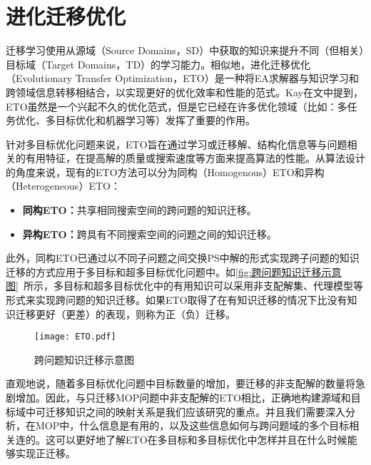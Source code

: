 \section{进化迁移优化}
\label{sec:背景介绍:进化迁移优化}
迁移学习使用从源域（Source Domains，SD）中获取的知识来提升不同（但相关）目标域（Target Domains，TD）的学习能力\cite{pan2009survey}。相似地，进化迁移优化（Evolutionary Transfer Optimization，ETO）是一种将EA求解器与知识学习和跨领域信息转移相结合，以实现更好的优化效率和性能的范式。Kay在文中提到\cite{tan2021evolutionary}，ETO虽然是一个兴起不久的优化范式，但是它已经在许多优化领域（比如：多任务优化、多目标优化和机器学习等）发挥了重要的作用。
\par
针对多目标优化问题来说，ETO旨在通过学习或迁移解、结构化信息等与问题相关的有用特征，在提高解的质量或搜索速度等方面来提高算法的性能。从算法设计的角度来说，现有的ETO方法可以分为同构（Homogenous）ETO和异构（Heterogeneous）ETO：
\begin{itemize}
    \item \textbf{同构ETO：}共享相同搜索空间的跨问题的知识迁移。
    \item \textbf{异构ETO：}跨具有不同搜索空间的问题之间的知识迁移。
\end{itemize}
此外，同构ETO已通过以不同子问题之间交换PS中解的形式实现跨子问题的知识迁移的方式应用于多目标和超多目标优化问题中\cite{tan2021evolutionary}。如\autoref{fig:跨问题知识迁移示意图}~所示，多目标和超多目标优化中的有用知识可以采用非支配解集、代理模型等形式来实现跨问题的知识迁移。如果ETO取得了在有知识迁移的情况下比没有知识迁移更好（更差）的表现，则称为正（负）迁移。
\begin{figure}[htb]
    \texttt{[image: ETO.pdf]}
    \caption[跨问题知识迁移示意图]{跨问题知识迁移示意图}
    \label{fig:跨问题知识迁移示意图}
\end{figure}
\par
直观地说，随着多目标优化问题中目标数量的增加，要迁移的非支配解的数量将急剧增加。因此，与只迁移MOP问题中非支配解的ETO相比，正确地构建源域和目标域中可迁移知识之间的映射关系是我们应该研究的重点。并且我们需要深入分析，在MOP中，什么信息是有用的，以及这些信息如何与跨问题域的多个目标相关连的。这可以更好地了解ETO在多目标和多目标优化中怎样并且在什么时候能够实现正迁移。

